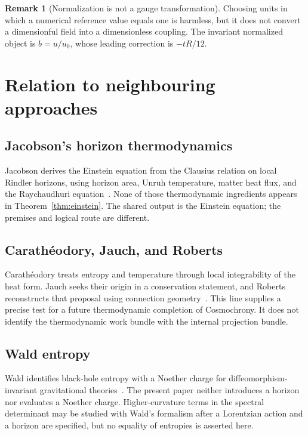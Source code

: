 \documentclass[12pt,a4paper]{article}
\theoremstyle{definition}
\newtheorem{remark}[theorem]{Remark}
\begin{document}
      \begin{remark}[Normalization is not a gauge transformation]
        \label{rem:gauge}
        Choosing units in which a numerical reference value equals one is harmless, but it does not convert a
        dimensionful field into a dimensionless coupling.
        The invariant normalized object is $b=u/u_0$, whose leading correction is $-tR/12$.
      \end{remark}

  \section{Relation to neighbouring approaches}
    \label{sec:relation-jacobson}

    \subsection{Jacobson's horizon thermodynamics}
      \label{subsec:jacobson}

      Jacobson derives the Einstein equation from the Clausius relation on local Rindler horizons, using horizon area,
      Unruh temperature, matter heat flux, and the Raychaudhuri equation~\cite{Jacobson1995}.
      None of those thermodynamic ingredients appears in Theorem~\ref{thm:einstein}.
      The shared output is the Einstein equation; the premises and logical route are different.

    \subsection{Carath\'{e}odory, Jauch, and Roberts}
      \label{subsec:unruh-analogy}

      Carath\'{e}odory treats entropy and temperature through local integrability of the heat form.
      Jauch seeks their origin in a conservation statement, and Roberts reconstructs that proposal using connection
      geometry~\cite{Caratheodory1909,Jauch1972,Roberts2026Heat,Roberts2026Origin}.
      This line supplies a precise test for a future thermodynamic completion of Cosmochrony.
      It does not identify the thermodynamic work bundle with the internal projection bundle.

    \subsection{Wald entropy}
      \label{subsec:wald}

      Wald identifies black-hole entropy with a Noether charge for diffeomorphism-invariant gravitational
      theories~\cite{Wald1993}.
      The present paper neither introduces a horizon nor evaluates a Noether charge.
      Higher-curvature terms in the spectral determinant may be studied with Wald's formalism after a Lorentzian
      action and a horizon are specified, but no equality of entropies is asserted here.
\end{document}
